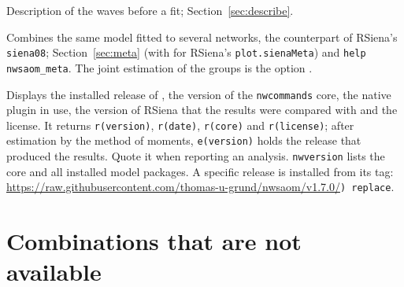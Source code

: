 \begin{description}[nosep,style=nextline]
  \item[\texttt{nwsaom describe}] Description of the waves before a fit; Section~\ref{sec:describe}.
  \item[\texttt{nwsaom meta}] Combines the same model fitted to several networks, the counterpart of RSiena's \texttt{siena08}; Section~\ref{sec:meta} (with  for RSiena's \texttt{plot.sienaMeta}) and \texttt{help nwsaom\_meta}. The joint estimation of the groups is the option .
  \item[\texttt{nwsaom version}] Displays the installed release of \nwsaom{}, the version of the \texttt{nwcommands} core, the native plugin in use, the version of RSiena that the results were compared with and the license. It returns \texttt{r(version)}, \texttt{r(date)}, \texttt{r(core)} and \texttt{r(license)}; after estimation by the method of moments, \texttt{e(version)} holds the release that produced the results. Quote it when reporting an analysis. \texttt{nwversion} lists the core and all installed model packages. A specific release is installed from its tag: \url{https://raw.githubusercontent.com/thomas-u-grund/nwsaom/v1.7.0/}\texttt{) replace}.
\end{description}

\section{Combinations that are not available}\label{sec:combinations}

